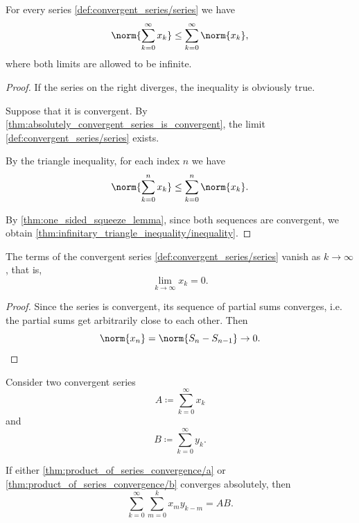 \begin{proposition}\label{thm:infinitary_triangle_inequality}
  For every series \eqref{def:convergent_series/series} we have
  \begin{equation}\label{thm:infinitary_triangle_inequality/inequality}
    \norm{\sum_{k=0}^\infty x_k} \leq \sum_{k=0}^\infty \norm{x_k},
  \end{equation}
  where both limits are allowed to be infinite.
\end{proposition}
\begin{proof}
  If the series on the right diverges, the inequality is obviously true.

  Suppose that it is convergent. By \cref{thm:absolutely_convergent_series_is_convergent}, the limit
  \eqref{def:convergent_series/series} exists.

  By the triangle inequality, for each index \( n \) we have
  \begin{equation*}
    \norm{\sum_{k=0}^n x_k} \leq \sum_{k=0}^n \norm{x_k}.
  \end{equation*}

  By \cref{thm:one_sided_squeeze_lemma}, since both sequences are convergent, we obtain \cref{thm:infinitary_triangle_inequality/inequality}.
\end{proof}

\begin{proposition}\label{thm:convergent_series_terms_vanish}
  The terms of the convergent series \eqref{def:convergent_series/series} vanish as \( k \to \infty \), that is,
  \begin{equation*}
    \lim_{k \to \infty} x_k = 0.
  \end{equation*}
\end{proposition}
\begin{proof}
  Since the series is convergent, its sequence of partial sums converges, i.e. the partial sums get arbitrarily close to each other. Then
  \begin{equation*}
    \norm{x_n} = \norm{S_n - S_{n-1}} \to 0.
  \end{equation*}
\end{proof}

\begin{theorem}\label{thm:product_of_series_convergence}
  Consider two convergent series
  \begin{equation}\label{thm:product_of_series_convergence/a}
    A \coloneqq \sum_{k=0}^\infty x_k
  \end{equation}
  and
  \begin{equation}\label{thm:product_of_series_convergence/b}
    B \coloneqq \sum_{k=0}^\infty y_k.
  \end{equation}

  If either \cref{thm:product_of_series_convergence/a} or \cref{thm:product_of_series_convergence/b} converges absolutely, then
  \begin{equation}\label{thm:product_of_series_convergence/prod}
    \sum_{k=0}^\infty \sum_{m=0}^k x_m y_{k-m} = AB.
  \end{equation}
\end{theorem}


